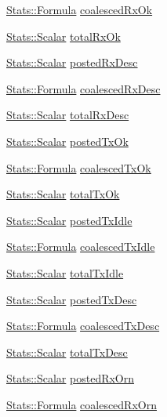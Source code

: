 \begin{DoxyCompactItemize}
\hyperlink{classStats_1_1Formula}{Stats::Formula} \hyperlink{classEtherDevice_abae38257949b8d762c09201d37cd5689}{coalescedRxOk}
\item 
\hyperlink{classStats_1_1Scalar}{Stats::Scalar} \hyperlink{classEtherDevice_a529f39d5853ce645515d6da72408ac0b}{totalRxOk}
\item 
\hyperlink{classStats_1_1Scalar}{Stats::Scalar} \hyperlink{classEtherDevice_a1c8f5b93630cf0e571becc7acbaf1855}{postedRxDesc}
\item 
\hyperlink{classStats_1_1Formula}{Stats::Formula} \hyperlink{classEtherDevice_a993880fc9f5b6b1c4049744dcd53e848}{coalescedRxDesc}
\item 
\hyperlink{classStats_1_1Scalar}{Stats::Scalar} \hyperlink{classEtherDevice_a86b2f941aa9e31fc2fce7e3c7c7fb2f7}{totalRxDesc}
\item 
\hyperlink{classStats_1_1Scalar}{Stats::Scalar} \hyperlink{classEtherDevice_ab01a687c765f1caf9cf5fb78a6b84615}{postedTxOk}
\item 
\hyperlink{classStats_1_1Formula}{Stats::Formula} \hyperlink{classEtherDevice_a48f6782efe700a4f30599130d8219cd7}{coalescedTxOk}
\item 
\hyperlink{classStats_1_1Scalar}{Stats::Scalar} \hyperlink{classEtherDevice_a50110afa2aba8b353bee5bc9972c89ec}{totalTxOk}
\item 
\hyperlink{classStats_1_1Scalar}{Stats::Scalar} \hyperlink{classEtherDevice_a49d4a7b1a482d1e3f79d0e1362b1fdad}{postedTxIdle}
\item 
\hyperlink{classStats_1_1Formula}{Stats::Formula} \hyperlink{classEtherDevice_ae7acc88aa991af2925df978d64db9718}{coalescedTxIdle}
\item 
\hyperlink{classStats_1_1Scalar}{Stats::Scalar} \hyperlink{classEtherDevice_a88da34038e19bc9de68caadbd724628f}{totalTxIdle}
\item 
\hyperlink{classStats_1_1Scalar}{Stats::Scalar} \hyperlink{classEtherDevice_a48e19f0007ceff60e41f3f4f0c3fd749}{postedTxDesc}
\item 
\hyperlink{classStats_1_1Formula}{Stats::Formula} \hyperlink{classEtherDevice_ae35392ae9dd2cdd0fcab6cda284c9d14}{coalescedTxDesc}
\item 
\hyperlink{classStats_1_1Scalar}{Stats::Scalar} \hyperlink{classEtherDevice_a09120f2465f42f76aa4af0fd72b53aea}{totalTxDesc}
\item 
\hyperlink{classStats_1_1Scalar}{Stats::Scalar} \hyperlink{classEtherDevice_a8ff06722ae7aa52cd4e58663c4f33aaa}{postedRxOrn}
\item 
\hyperlink{classStats_1_1Formula}{Stats::Formula} \hyperlink{classEtherDevice_a956bbb7541a7325de58a99f382ec5678}{coalescedRxOrn}

\end{DoxyCompactItemize}
